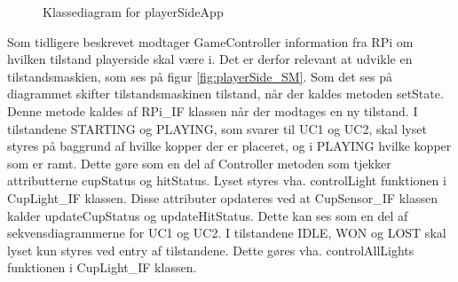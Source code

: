 \documentclass[Rapport/Rapport_main.tex]{subfiles}
\begin{document}
\begin{figure}[H]
    \centering
    \centering
    \caption{Klassediagram for playerSideApp}
    \label{fig:CD_PlayerSide}
\end{figure}

Som tidligere beskrevet modtager GameController information fra RPi om hvilken tilstand playerside skal være i. Det er derfor relevant at udvikle en tilstandsmaskien, som ses på figur \ref{fig:playerSide_SM}. Som det ses på diagrammet skifter tilstandsmaskinen tilstand, når der kaldes metoden setState. Denne metode kaldes af RPi\_IF klassen når der modtages en ny tilstand. I tilstandene STARTING og PLAYING, som svarer til UC1 og UC2, skal lyset styres på baggrund af hvilke kopper der er placeret, og i PLAYING hvilke kopper som er ramt. Dette gøre som en del af Controller metoden som tjekker attributterne cupStatus og hitStatus. Lyset styres vha. controlLight funktionen i CupLight\_IF klassen. Disse attributer opdateres ved at CupSensor\_IF klassen kalder updateCupStatus og updateHitStatus. Dette kan ses som en del af sekvensdiagrammerne for UC1 og UC2. I tilstandene IDLE, WON og LOST skal lyset kun styres ved entry af tilstandene. Dette gøres vha. controlAllLights funktionen i CupLight\_IF klassen.      
\end{document}

